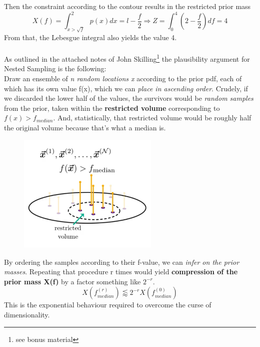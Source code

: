 \documentclass[12pt, a4paper]{scrartcl}
\begin{document}
Then the constraint according to the contour results in the restricted prior mass
\[X(f)=\int_{x>\sqrt{f}}^2p(x)dx=l-\frac f2 \Rightarrow Z=\int_0^4\left(2-\frac f2 \right)df=4\]
From that, the Lebesgue integral also yields the value 4.\\

\\

As outlined in the attached notes of John Skilling\footnote{see bonus material} the plausibility argument
for Nested Sampling is the following:\\
 Draw an ensemble of \textit{n random locations
x} according to the prior pdf, each of which has its own value f(x), which we
can \textit{place in ascending order}. Crudely, if we discarded the lower half of the
values, the survivors would be \textit{random samples} from the prior, taken within
the \textbf{restricted volume} corresponding to $f(x) > f_{median}$. And, statistically,
that restricted volume would be roughly half the original volume because
that’s what a median is.%
 \begin{figure}[H]
	\centering
	\includegraphics[width=0.6\textwidth]{9_7.png}
\end{figure}
By ordering the samples according to their f-value, we can \textit{infer on the prior masses}. Repeating that procedure r times would yield  \textbf{compression of the prior mass X(f)} by a factor something like $2^{-r}$. 
\[X(f_{median}^{(r)})\lessapprox 2^{-r}X(f_{median}^{(0)})\]
This is the exponential behaviour required to overcome the curse of dimensionality.\\
\end{document}
